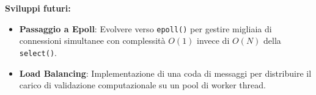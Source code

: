 \documentclass[a4paper,12pt]{article}
\begin{document}
\noindent \textbf{Sviluppi futuri:}
\begin{itemize}
    \item \textbf{Passaggio a Epoll}: Evolvere verso \texttt{epoll()} per gestire migliaia di connessioni simultanee con complessità $O(1)$ invece di $O(N)$ della \texttt{select()}.
    \item \textbf{Load Balancing}: Implementazione di una coda di messaggi per distribuire il carico di validazione computazionale su un pool di worker thread.
\end{itemize}
\end{document}
